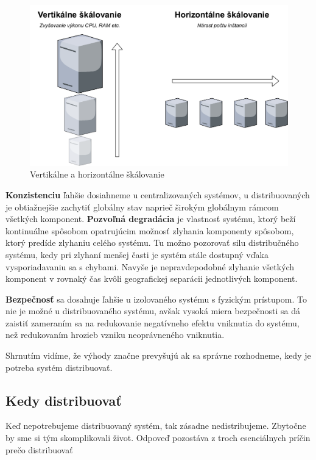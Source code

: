 \begin{figure}[H]
	\centering
	\includegraphics[scale=0.6]{obrazky-figures/TR-scaling}
	\caption{Vertikálne a horizontálne škálovanie}
	\label{fig:scaling}
\end{figure}

\textbf{Konzistenciu} ľahšie dosiahneme u centralizovaných systémov, u distribuovaných je obtiažnejšie zachytiť globálny stav naprieč širokým globálnym rámcom všetkých komponent. \textbf{Pozvoľná degradácia} je vlastnosť systému, ktorý beží kontinuálne spôsobom opatrujúcim možnosť zlyhania komponenty spôsobom, ktorý predíde zlyhaniu celého systému. Tu možno pozorovať silu distribučného systému, kedy pri zlyhaní menšej časti je systém stále dostupný vďaka vysporiadavaniu sa s chybami. Navyše je nepravdepodobné zlyhanie všetkých komponent v rovnaký čas kvôli geografickej separácii jednotlivých komponent.

\textbf{Bezpečnosť} sa dosahuje ľahšie u izolovaného systému s fyzickým prístupom. To nie je možné u distribuovaného systému, avšak vysoká miera bezpečnosti sa dá zaistiť zameraním sa na redukovanie negatívneho efektu vniknutia do systému, než redukovaním hrozieb vzniku neoprávneného vniknutia.

Shrnutím vidíme, že výhody značne prevyšujú ak sa správne rozhodneme, kedy je potreba systém distribuovať.

\subsection{Kedy distribuovať}


Keď nepotrebujeme distribuovaný systém, tak zásadne nedistribujeme. Zbytočne by sme si tým skomplikovali život. Odpoveď pozostáva z troch esenciálnych príčin prečo distribuovať

